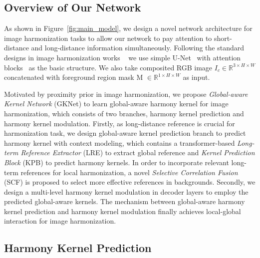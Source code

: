 \documentclass[10pt,twocolumn,letterpaper]{article}
\begin{document}
\subsection{Overview of Our Network}

As shown in Figure~\ref{fig:main_model}, we design a novel network architecture for image harmonization tasks to allow our network to pay attention to short-distance and long-distance information simultaneously. Following the standard designs in image harmonization works ~\cite{cun_2020_TIP,Sofiiuk_2021_WACV,Ling_2021_CVPR} we use simple U-Net~\cite{ronneberger2015u} with attention blocks~\cite{cun_2020_TIP} as the basic structure. We also take composited RGB image $I_c \in \mathbb{R}^{3 \times H \times W}$ concatenated with foreground region mask M $\in \mathbb{R}^{1 \times H \times W}$ as input.

Motivated by proximity prior in image harmonization, we propose \emph{Global-aware Kernel Network} (GKNet) to learn global-aware harmony kernel for image harmonization, which consists of two branches, harmony kernel prediction and harmony kernel modulation. Firstly, as long-distance reference is crucial for harmonization task, we design global-aware kernel prediction branch to predict harmony kernel with context modeling, which contains a transformer-based \emph{Long-term Reference Extractor} (LRE) to extract global reference and \emph{Kernel Prediction Block} (KPB) to predict harmony kernels. In order to incorporate relevant long-term references for local harmonization, a novel \emph{Selective Correlation Fusion} (SCF) is proposed to select more effective references in backgrounds. Secondly, we design a multi-level harmony kernel modulation in decoder layers to employ the predicted global-aware kernels. The mechanism between global-aware harmony kernel prediction and harmony kernel modulation finally achieves local-global interaction for image harmonization.

\subsection{Harmony Kernel Prediction} 
\label{sec:HKP}
\end{document}
